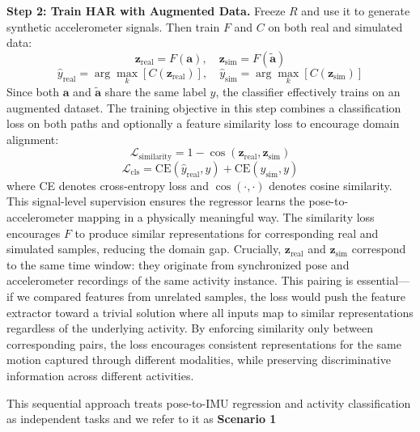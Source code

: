 \textbf{Step 2: Train HAR with Augmented Data.} Freeze $R$ and use it to generate synthetic accelerometer signals. Then train $F$ and $C$ on both real and simulated data:
\begin{equation}
    \mathbf{z}_{\text{real}} = F(\mathbf{a}), \quad \mathbf{z}_{\text{sim}} = F(\tilde{\mathbf{a}})
    \label{eq:F}
\end{equation}
\begin{equation}
    \hat{y}_{\text{real}} = \arg\max_k [C(\mathbf{z}_{\text{real}})], \quad \hat{y}_{\text{sim}} = \arg\max_k [C(\mathbf{z}_{\text{sim}})]
\end{equation}
Since both $\mathbf{a}$ and $\tilde{\mathbf{a}}$ share the same label $y$, the classifier effectively trains on an augmented dataset. The training objective in this step combines a classification loss on both paths and optionally a feature similarity loss to encourage domain alignment:
\begin{equation}
    \mathcal{L}_{\text{similarity}} = 1 - \cos(\mathbf{z}_{\text{real}}, \mathbf{z}_{\text{sim}})
\end{equation}
\begin{equation}
    \mathcal{L}_{\text{cls}} = \text{CE}(\hat{y}_{\text{real}}, y) + \text{CE}(\hat{y}_{\text{sim}}, y)
\end{equation}
where CE denotes cross-entropy loss and $\cos(\cdot, \cdot)$ denotes cosine similarity. This signal-level supervision ensures the regressor learns the pose-to-accelerometer mapping in a physically meaningful way. The similarity loss encourages $F$ to produce similar representations for corresponding real and simulated samples, reducing the domain gap. Crucially, $\mathbf{z}_{\text{real}}$ and $\mathbf{z}_{\text{sim}}$ correspond to the same time window: they originate from synchronized pose and accelerometer recordings of the same activity instance. This pairing is essential---if we compared features from unrelated samples, the loss would push the feature extractor toward a trivial solution where all inputs map to similar representations regardless of the underlying activity. By enforcing similarity only between corresponding pairs, the loss encourages consistent representations for the same motion captured through different modalities, while preserving discriminative information across different activities.

This sequential approach treats pose-to-IMU regression and activity classification as independent tasks and we refer to it as \textbf{Scenario 1}

